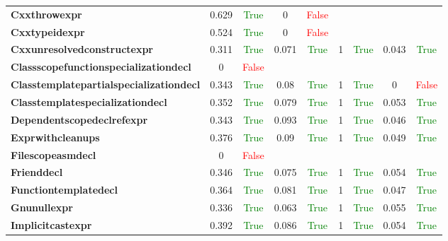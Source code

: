 \documentclass{article}
\begin{document}
\begin{xltabular}{\textwidth}{lcccccccc}
\textbf{{\fontsize{10}{12}\selectfont Cxxthrowexpr}}& 0.629&\textcolor{green}{True}& 0&\textcolor{red}{False} \\[0.5ex]
\textbf{{\fontsize{10}{12}\selectfont Cxxtypeidexpr}}& 0.524&\textcolor{green}{True}& 0&\textcolor{red}{False} \\[0.5ex]
\textbf{{\fontsize{10}{12}\selectfont Cxxunresolvedconstructexpr}}& 0.311&\textcolor{green}{True}& 0.071&\textcolor{green}{True}& 1&\textcolor{green}{True}& 0.043&\textcolor{green}{True} \\[0.5ex]
\textbf{{\fontsize{10}{12}\selectfont Classscopefunctionspecializationdecl}}& 0&\textcolor{red}{False} \\[0.5ex]
\textbf{{\fontsize{10}{12}\selectfont Classtemplatepartialspecializationdecl}}& 0.343&\textcolor{green}{True}& 0.08&\textcolor{green}{True}& 1&\textcolor{green}{True}& 0&\textcolor{red}{False} \\[0.5ex]
\textbf{{\fontsize{10}{12}\selectfont Classtemplatespecializationdecl}}& 0.352&\textcolor{green}{True}& 0.079&\textcolor{green}{True}& 1&\textcolor{green}{True}& 0.053&\textcolor{green}{True} \\[0.5ex]
\textbf{{\fontsize{10}{12}\selectfont Dependentscopedeclrefexpr}}& 0.343&\textcolor{green}{True}& 0.093&\textcolor{green}{True}& 1&\textcolor{green}{True}& 0.046&\textcolor{green}{True} \\[0.5ex]
\textbf{{\fontsize{10}{12}\selectfont Exprwithcleanups}}& 0.376&\textcolor{green}{True}& 0.09&\textcolor{green}{True}& 1&\textcolor{green}{True}& 0.049&\textcolor{green}{True} \\[0.5ex]
\textbf{{\fontsize{10}{12}\selectfont Filescopeasmdecl}}& 0&\textcolor{red}{False} \\[0.5ex]
\textbf{{\fontsize{10}{12}\selectfont Frienddecl}}& 0.346&\textcolor{green}{True}& 0.075&\textcolor{green}{True}& 1&\textcolor{green}{True}& 0.054&\textcolor{green}{True} \\[0.5ex]
\textbf{{\fontsize{10}{12}\selectfont Functiontemplatedecl}}& 0.364&\textcolor{green}{True}& 0.081&\textcolor{green}{True}& 1&\textcolor{green}{True}& 0.047&\textcolor{green}{True} \\[0.5ex]
\textbf{{\fontsize{10}{12}\selectfont Gnunullexpr}}& 0.336&\textcolor{green}{True}& 0.063&\textcolor{green}{True}& 1&\textcolor{green}{True}& 0.055&\textcolor{green}{True} \\[0.5ex]
\textbf{{\fontsize{10}{12}\selectfont Implicitcastexpr}}& 0.392&\textcolor{green}{True}& 0.086&\textcolor{green}{True}& 1&\textcolor{green}{True}& 0.054&\textcolor{green}{True} \\[0.5ex]

\end{xltabular}
\end{document}
